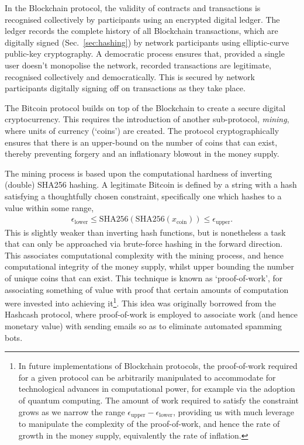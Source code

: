In the Blockchain protocol, the validity of contracts and transactions is recognised collectively by participants using an encrypted digital ledger. The ledger records the complete history of all Blockchain transactions, which are digitally signed (Sec.~\ref{sec:hashing}) by network participants using elliptic-curve public-key cryptography. A democratic process ensures that, provided a single user doesn't monopolise the network, recorded transactions are legitimate, recognised collectively and democratically. This is secured by network participants digitally signing off on transactions as they take place.

The Bitcoin protocol builds on top of the Blockchain to create a secure digital cryptocurrency. This requires the introduction of another sub-protocol, \textit{mining}, where units of currency (`coins') are created. The protocol cryptographically ensures that there is an upper-bound on the number of coins that can exist, thereby preventing forgery and an inflationary blowout in the money supply.

The mining process is based upon the computational hardness of inverting (double) SHA256 hashing. A legitimate Bitcoin is defined by a string with a hash satisfying a thoughtfully chosen constraint, specifically one which hashes to a value within some range,
\begin{align}
	\epsilon_\mathrm{lower}\leq \mathrm{SHA256}(\mathrm{SHA256}(x_\mathrm{coin})) \leq \epsilon_\mathrm{upper}.
\end{align}
This is slightly weaker than inverting hash functions, but is nonetheless a task that can only be approached via brute-force hashing in the forward direction. This associates computational complexity with the mining process, and hence computational integrity of the money supply, whilst upper bounding the number of unique coins that can exist. This technique is known as `proof-of-work', for associating something of value with proof that certain amounts of computation were invested into achieving it\footnote{In future implementations of Blockchain protocols, the proof-of-work required for a given protocol can be arbitrarily manipulated to accommodate for technological advances in computational power, for example via the adoption of quantum computing. The amount of work required to satisfy the constraint grows as we narrow the range \mbox{$\epsilon_\mathrm{upper}-\epsilon_\mathrm{lower}$}, providing us with much leverage to manipulate the complexity of the proof-of-work, and hence the rate of growth in the money supply, equivalently the rate of inflation.}. This idea was originally borrowed from the Hashcash protocol, where proof-of-work is employed to associate work (and hence monetary value) with sending emails so as to eliminate automated spamming bots.

